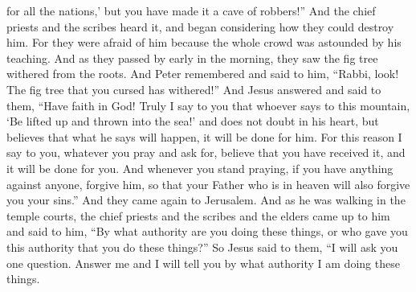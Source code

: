 \begin{biblechapter}
for all the nations,’
\verse but you have made it a cave of robbers!”
\verse And the chief priests and the scribes heard it, and began considering how they could destroy him. For they were afraid of him because the whole crowd was astounded by his teaching.
 And as they passed by early in the morning, they saw the fig tree withered from the roots.
\verse And Peter remembered and said to him, “Rabbi, look! The fig tree that you cursed has withered!”
\verse And Jesus answered and said to them, “Have faith in God!
\verse Truly I say to you that whoever says to this mountain, ‘Be lifted up and thrown into the sea!’ and does not doubt in his heart, but believes that what he says will happen, it will be done for him.
\verse For this reason I say to you, whatever you pray and ask for, believe that you have received it, and it will be done for you.
\verse And whenever you stand praying, if you have anything against anyone, forgive him, so that your Father who is in heaven will also forgive you your sins.”
 And they came again to Jerusalem. And as he was walking in the temple courts, the chief priests and the scribes and the elders came up to him
\verse and said to him, “By what authority are you doing these things, or who gave you this authority that you do these things?”
\verse So Jesus said to them, “I will ask you one question. Answer me and I will tell you by what authority I am doing these things.

\end{biblechapter}
